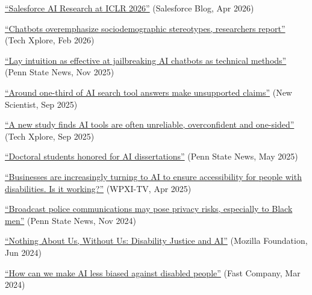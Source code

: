 
{\paragraphstyle
\vspace{3mm}\begin{cvitems}
  \item {\href{https://www.salesforce.com/blog/salesforce-iclr-2026/}{“Salesforce AI Research at ICLR 2026”} (Salesforce Blog, Apr 2026)}
  \item {\href{https://techxplore.com/news/2026-02-chatbots-overemphasize-sociodemographic-stereotypes.html}{“Chatbots overemphasize sociodemographic stereotypes, researchers report”} (Tech Xplore, Feb 2026)}
  \item {\href{https://www.psu.edu/news/research/story/lay-intuition-effective-jailbreaking-ai-chatbots-technical-methods}{“Lay intuition as effective at jailbreaking AI chatbots as technical methods”} (Penn State News, Nov 2025)}
  \item {\href{https://www.newscientist.com/article/2496133-around-one-third-of-ai-search-tool-answers-make-unsupported-claims/}{“Around one-third of AI search tool answers make unsupported claims”} (New Scientist, Sep 2025)}
  \item {\href{https://techxplore.com/news/2025-09-ai-tools-unreliable-overconfident-sided.html}{“A new study finds AI tools are often unreliable, overconfident and one-sided”} (Tech Xplore, Sep 2025)}
  \item {\href{https://ai.psu.edu/doctoral-students-honored-for-ai-dissertations/}{“Doctoral students honored for AI dissertations”} (Penn State News, May 2025)}
  \item {\href{https://www.wpxi.com/news/businesses-are-increasingly-turning-ai-ensure-accessibility-people-with-disabilities-is-it-working/XYS66B3BNFOUBKPK3IA2KTTYKY/}{“Businesses are increasingly turning to AI to ensure accessibility for people with disabilities. Is it working?”} (WPXI-TV, Apr 2025)}
  \item {\href{https://www.psu.edu/news/research/story/broadcast-police-communications-may-pose-privacy-risks-especially-black-men}{“Broadcast police communications may pose privacy risks, especially to Black men”} (Penn State News, Nov 2024)}
  \item {\href{https://foundation.mozilla.org/en/blog/disability-justice-and-ai/}{“Nothing About Us, Without Us: Disability Justice and AI”} (Mozilla Foundation, Jun 2024)}
  \item {\href{https://www.fastcompany.com/91054056/how-we-can-make-ai-less-biased-against-disabled-people}{“How can we make AI less biased against disabled people”} (Fast Company, Mar 2024)}

\end{cvitems}}
